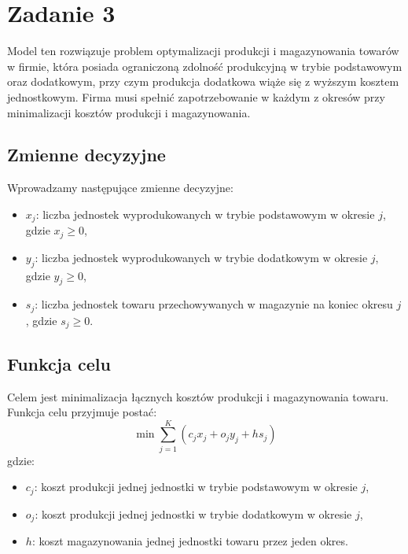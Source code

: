 \documentclass[12pt, letterpaper]{article}
\begin{document}
\section{Zadanie 3}

Model ten rozwiązuje problem optymalizacji produkcji i magazynowania towarów w
firmie, która posiada ograniczoną zdolność produkcyjną w trybie podstawowym
oraz dodatkowym, przy czym produkcja dodatkowa wiąże się z wyższym kosztem
jednostkowym. Firma musi spełnić zapotrzebowanie w każdym z okresów przy
minimalizacji kosztów produkcji i magazynowania.

\subsection*{Zmienne decyzyjne}
Wprowadzamy następujące zmienne decyzyjne:
\begin{itemize}
  \item \( x_j \): liczba jednostek wyprodukowanych w trybie podstawowym w
        okresie \( j \), gdzie \( x_j \geq 0 \),
  \item \( y_j \): liczba jednostek wyprodukowanych w trybie dodatkowym w
        okresie \( j \), gdzie \( y_j \geq 0 \),
  \item \( s_j \): liczba jednostek towaru przechowywanych w magazynie na
        koniec okresu \( j \), gdzie \( s_j \geq 0 \).
\end{itemize}

\subsection*{Funkcja celu}
Celem jest minimalizacja łącznych kosztów produkcji i magazynowania towaru.
Funkcja celu przyjmuje postać:
\[
  \min \sum_{j=1}^K \left( c_j x_j + o_j y_j + h s_j \right)
\]
gdzie:
\begin{itemize}
  \item \( c_j \): koszt produkcji jednej jednostki w trybie podstawowym w
        okresie \( j \),
  \item \( o_j \): koszt produkcji jednej jednostki w trybie dodatkowym w
        okresie \( j \),
  \item \( h \): koszt magazynowania jednej jednostki towaru przez jeden okres.
\end{itemize}
\end{document}
